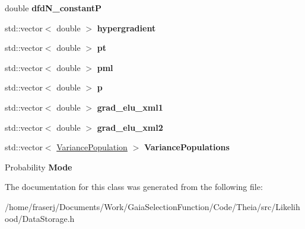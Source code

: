 \begin{DoxyCompactItemize}
double {\bfseries dfd\+N\+\_\+constantP}
\item 
\mbox{\label{classLikelihoodData_a2783d19e10a237046558f19a5b092b08}} 
std\+::vector$<$ double $>$ {\bfseries hypergradient}
\item 
\mbox{\label{classLikelihoodData_a2b64e9d5f3c7e213acc1624dee4f083c}} 
std\+::vector$<$ double $>$ {\bfseries pt}
\item 
\mbox{\label{classLikelihoodData_a1e6b3b209c44b5d459858ceaa58fca57}} 
std\+::vector$<$ double $>$ {\bfseries pml}
\item 
\mbox{\label{classLikelihoodData_ac8cba3cd7ccaa7bcade1ad9590cd7e0a}} 
std\+::vector$<$ double $>$ {\bfseries p}
\item 
\mbox{\label{classLikelihoodData_a214d9b6e92856dff046ba31ce3c931e9}} 
std\+::vector$<$ double $>$ {\bfseries grad\+\_\+elu\+\_\+xml1}
\item 
\mbox{\label{classLikelihoodData_ac803a4c9bd059ea6e23248cde5ff7290}} 
std\+::vector$<$ double $>$ {\bfseries grad\+\_\+elu\+\_\+xml2}
\item 
\mbox{\label{classLikelihoodData_a1a1b8c65c6e8c79e0a19d3ccaa812087}} 
std\+::vector$<$ \hyperlink{structVariancePopulation}{Variance\+Population} $>$ {\bfseries Variance\+Populations}
\item 
\mbox{\label{classLikelihoodData_af71c3fde62f3e51803d19bd878f274c0}} 
Probability {\bfseries Mode}
\end{DoxyCompactItemize}


The documentation for this class was generated from the following file\+:\begin{DoxyCompactItemize}
\item 
/home/fraserj/\+Documents/\+Work/\+Gaia\+Selection\+Function/\+Code/\+Theia/src/\+Likelihood/Data\+Storage.\+h\end{DoxyCompactItemize}

